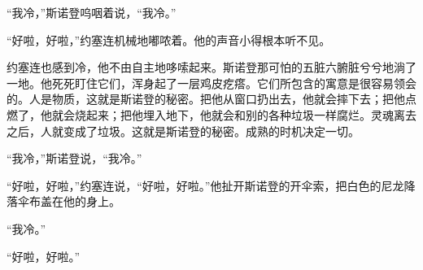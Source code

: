     “我冷，”斯诺登呜咽着说，“我冷。”

    “好啦，好啦，”约塞连机械地嘟哝着。他的声音小得根本听不见。

    约塞连也感到冷，他不由自主地哆嗦起来。斯诺登那可怕的五脏六腑脏兮兮地淌了一地。他死死盯住它们，浑身起了一层鸡皮疙瘩。它们所包含的寓意是很容易领会的。人是物质，这就是斯诺登的秘密。把他从窗口扔出去，他就会摔下去；把他点燃了，他就会烧起来；把他埋入地下，他就会和别的各种垃圾一样腐烂。灵魂离去之后，人就变成了垃圾。这就是斯诺登的秘密。成熟的时机决定一切。

    “我冷，”斯诺登说，“我冷。”

    “好啦，好啦，”约塞连说，“好啦，好啦。”他扯开斯诺登的开伞索，把白色的尼龙降落伞布盖在他的身上。

    “我冷。”

    “好啦，好啦。”
